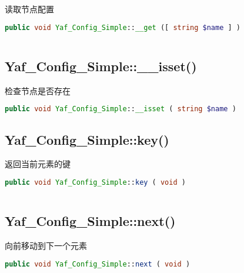 读取节点配置

\begin{lstlisting}[language=PHP]
public void Yaf_Config_Simple::__get ([ string $name ] )
\end{lstlisting}



\begin{lstlisting}[language=PHP]

\end{lstlisting}


\subsection{Yaf\_Config\_Simple::\_\_isset()}

检查节点是否存在

\begin{lstlisting}[language=PHP]
public void Yaf_Config_Simple::__isset ( string $name )
\end{lstlisting}


\subsection{Yaf\_Config\_Simple::key()}

返回当前元素的键


\begin{lstlisting}[language=PHP]
public void Yaf_Config_Simple::key ( void )
\end{lstlisting}



\begin{lstlisting}[language=PHP]

\end{lstlisting}


\subsection{Yaf\_Config\_Simple::next()}

向前移动到下一个元素

\begin{lstlisting}[language=PHP]
public void Yaf_Config_Simple::next ( void )
\end{lstlisting}

\begin{lstlisting}[language=PHP]

\end{lstlisting}



